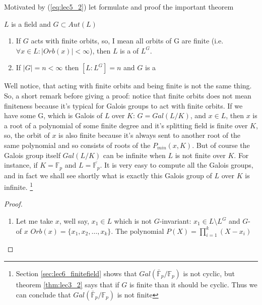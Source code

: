 Motivated by (\ref{eq:lec5_2}) let formulate and proof the important
theorem
\begin{theorem}[Artin]
  \label{thm:artin}
  $L$ is a field and $G \subset Aut\left(L\right)$
  \begin{enumerate}
  \item If $G$ acts with finite orbits,  so, I mean all orbits of G
    are finite (i.e. $\forall x \in L: \left|Orb(x)\right| < \infty$),
    then $L$ is a  of $L^G$. 
  \item If $\left|G\right| = n < \infty$ then
    $\left[L : L^G\right] = n$ and $G$ is a 
  \end{enumerate}

  \begin{remark}
    Well notice, that acting with finite orbits  and being finite is not
    the same thing. So, a short remark before giving a proof: notice
    that finite orbits does not mean finiteness because it's typical for
    Galois groups to act with finite orbits.  If we have some G, which
    is Galois of $L$ over $K$: $G = Gal\left(L/K\right)$, and
    $x \in L$, then $x$ is a root of a 
    polynomial of some finite degree  and it's splitting field is
    finite over $K$, so, the orbit of $x$ is also finite 
    because it's always sent to another root of the
    same polynomial and so consists of roots of  the
    $P_{min}\left(x, K\right)$. But of course the Galois group itself
    $Gal\left(L/K\right)$ can be infinite when $L$ is not finite over $K$. For
    instance, if  $K  = \mathbb{F}_p$ and $L = \overline{\mathbb{F}_p}$. It is
    very easy to compute all the Galois groups, and in fact we shall see
    shortly what is exactly this Galois group of $L$ over $K$ is infinite.
    \footnote{
      Section \ref{sec:lec6_finitefield} shows that
      $Gal\left(\bar{\mathbb{F}}_p/\mathbb{F}_p\right)$ is not cyclic,
      but theorem \ref{thm:lec3_2} says that if $G$ is finite than it
      should be cyclic. Thus we can conclude that
      $Gal\left(\bar{\mathbb{F}}_p/\mathbb{F}_p\right)$ is not finite
    }
  \end{remark}
  \begin{proof}
    \begin{enumerate}
    \item  Let me take $x$, well say, $x_1 \in L$ which is not
      $G$-invariant: $x_1 \in L \setminus L^G$ and
      $G$- of $x$ 
      $Orb(x) = \{x_1, x_2, \dots, x_k\}$. The
      polynomial $P\left(X\right) = \prod_{i=1}^k\left(X - x_i\right)$

\end{enumerate}
\end{proof}
\end{theorem}
